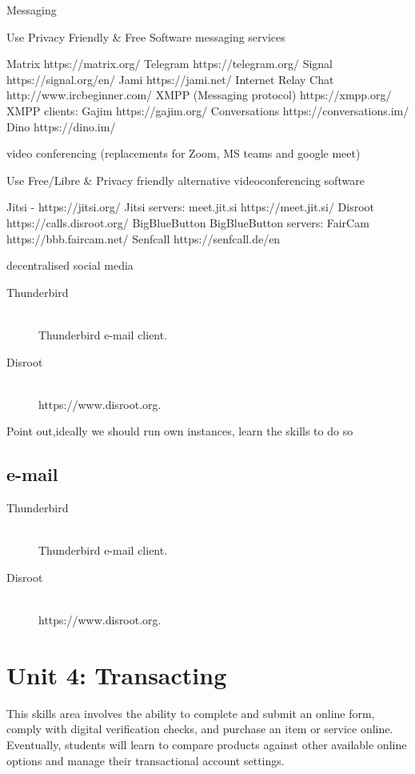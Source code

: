 Messaging

Use Privacy Friendly & Free Software messaging services

    Matrix https://matrix.org/
    Telegram https://telegram.org/
    Signal https://signal.org/en/
    Jami https://jami.net/
    Internet Relay Chat http://www.ircbeginner.com/
    XMPP (Messaging protocol) https://xmpp.org/
    XMPP clients:
        Gajim https://gajim.org/
        Conversations https://conversations.im/
        Dino https://dino.im/


video conferencing (replacements for Zoom, MS teams and google meet)

Use Free/Libre & Privacy friendly alternative videoconferencing software

    Jitsi - https://jitsi.org/
    Jitsi servers:
        meet.jit.si https://meet.jit.si/
        Disroot https://calls.disroot.org/
    BigBlueButton
    BigBlueButton servers:
        FairCam https://bbb.faircam.net/
        Senfcall https://senfcall.de/en




decentralised social media

\begin{description}
  \item[Thunderbird] \mbox{}\\ Thunderbird e-mail client.
  \item[Disroot] \mbox{}\\ https://www.disroot.org.
\end{description}

Point out,ideally we should run own instances, learn the skills to do so


\subsection{e-mail}
\begin{description}
  \item[Thunderbird] \mbox{}\\ Thunderbird e-mail client.
  \item[Disroot] \mbox{}\\ https://www.disroot.org.
\end{description}


\section{Unit 4: Transacting}

This skills area involves the ability to complete and submit an online form, comply with digital verification checks, and purchase an item or service online. Eventually, students will learn to compare products against other available online options and manage their transactional account settings.

